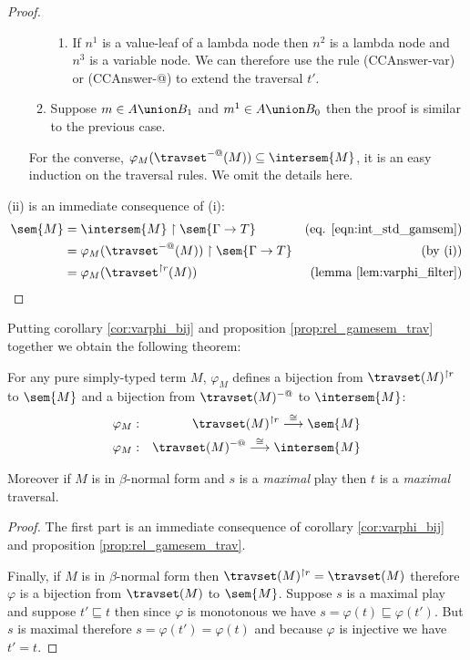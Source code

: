 \begin{proof}
\begin{itemize}
\begin{enumerate}
\begin{enumerate}
        \item If $n^1$ is a value-leaf of a lambda node then $n^2$ is a lambda node and $n^3$ is a variable node.
        We can therefore use the rule (CCAnswer-var) or (CCAnswer-@) to extend the traversal $t'$.
        \end{enumerate}

    \item Suppose $m \in A \union B_1$ and $m^1 \in A \union B_0$ then
    the proof is similar to the previous case.
    \end{enumerate}


  For the converse, $\varphi_{M}( \travset^{-@}(M) ) \subseteq \intersem{M}$, it is an easy induction
  on the traversal rules. We omit the details here.
\end{itemize}

(ii) is an immediate consequence of (i):
\begin{align*}
\sem{M} &= \intersem{M} \upharpoonright \sem{\Gamma \rightarrow T} & \mbox{(eq. \ref{eqn:int_std_gamsem})} \\
        &= \varphi_M(\travset^{-@}(M)) \upharpoonright \sem{\Gamma \rightarrow T} & \mbox{(by (i))}\\
        &= \varphi_M(\travset^{\upharpoonright r}(M)) & \mbox{(lemma \ref{lem:varphi_filter})}
\end{align*}
\end{proof}


Putting corollary \ref{cor:varphi_bij} and proposition
\ref{prop:rel_gamesem_trav} together we obtain the following
theorem:

\begin{thm}
For any pure simply-typed term $M$, $\varphi_M$ defines a bijection from
$\travset(M)^{\upharpoonright r}$ to $\sem{M}$ and a bijection
from $\travset(M)^{-@}$ to $\intersem{M}$:
\begin{eqnarray*}
 \varphi_M  &:& \travset(M)^{\upharpoonright r} \stackrel{\cong}{\longrightarrow} \sem{M} \\
 \varphi_M  &:& \travset(M)^{-@} \stackrel{\cong}{\longrightarrow} \intersem{M}
\end{eqnarray*}

Moreover if $M$ is in $\beta$-normal form and $s$ is a
\emph{maximal} play then  $t$ is a \emph{maximal} traversal.
\end{thm}

\begin{proof}
The first part is an immediate consequence of corollary
\ref{cor:varphi_bij} and proposition
\ref{prop:rel_gamesem_trav}.

Finally, if $M$ is in $\beta$-normal form then
$\travset(M)^{\upharpoonright r} = \travset(M)$
therefore $\varphi$ is a bijection from $\travset(M)$ to
$\sem{M}$. Suppose $s$ is a maximal play and suppose $t' \sqsubseteq
t$ then since $\varphi$ is monotonous we have $s = \varphi(t) \sqsubseteq
\varphi(t')$. But $s$ is maximal therefore $s = \varphi(t') =
\varphi(t)$ and because $\varphi$ is injective we have $t'=t$.
\end{proof}

